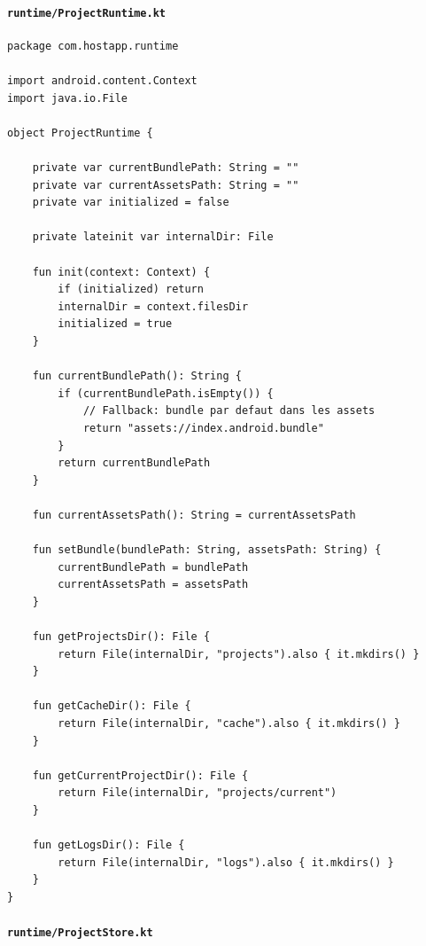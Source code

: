 \documentclass[11pt]{article}
\begin{document}
\paragraph{\texttt{runtime/ProjectRuntime.kt}}

\begin{verbatim}
package com.hostapp.runtime

import android.content.Context
import java.io.File

object ProjectRuntime {

    private var currentBundlePath: String = ""
    private var currentAssetsPath: String = ""
    private var initialized = false

    private lateinit var internalDir: File

    fun init(context: Context) {
        if (initialized) return
        internalDir = context.filesDir
        initialized = true
    }

    fun currentBundlePath(): String {
        if (currentBundlePath.isEmpty()) {
            // Fallback: bundle par defaut dans les assets
            return "assets://index.android.bundle"
        }
        return currentBundlePath
    }

    fun currentAssetsPath(): String = currentAssetsPath

    fun setBundle(bundlePath: String, assetsPath: String) {
        currentBundlePath = bundlePath
        currentAssetsPath = assetsPath
    }

    fun getProjectsDir(): File {
        return File(internalDir, "projects").also { it.mkdirs() }
    }

    fun getCacheDir(): File {
        return File(internalDir, "cache").also { it.mkdirs() }
    }

    fun getCurrentProjectDir(): File {
        return File(internalDir, "projects/current")
    }

    fun getLogsDir(): File {
        return File(internalDir, "logs").also { it.mkdirs() }
    }
}
\end{verbatim}

\paragraph{\texttt{runtime/ProjectStore.kt}}
\end{document}
